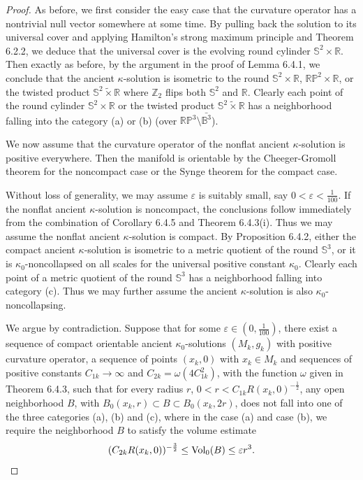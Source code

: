 \begin{proof}
As before, we first consider the easy case that the curvature
operator has a nontrivial null vector somewhere at some time. By
pulling back the solution to its universal cover and applying
Hamilton's strong maximum principle and Theorem 6.2.2, we deduce
that the universal cover is the evolving round cylinder
$\mathbb{S}^2 \times \mathbb{R}$. Then exactly as before, by the
argument in the proof of Lemma 6.4.1, we conclude that the ancient
$\kappa$-solution is isometric to the round $\mathbb{S}^2 \times
\mathbb{R}$, $\mathbb{R}\mathbb{P}^2 \times \mathbb{R}$, or the
twisted product $\mathbb{S}^2 \tilde{\times} \mathbb{R}$ where
$\mathbb{Z}_2$ flips both $\mathbb{S}^2$ and $\mathbb{R}$. Clearly
each point of the round cylinder $\mathbb{S}^2 \times \mathbb{R}$
or the twisted product $\mathbb{S}^2 \tilde{\times} \mathbb{R}$
has a neighborhood falling into the category (a) or (b) (over
$\mathbb{R}\mathbb{P}^3\setminus\bar{\mathbb{B}^3}$).

We now assume that the curvature operator of the nonflat ancient
$\kappa$-solution is positive everywhere. Then the manifold is
orientable by the Cheeger-Gromoll theorem \cite{CG} for the
noncompact case or the Synge theorem \cite{CE} for the compact
case.

Without loss of generality, we may assume $\varepsilon$ is
suitably small, say $0<\varepsilon < \frac{1}{100}$. If the
nonflat ancient $\kappa$-solution is noncompact, the conclusions
follow immediately from the combination of Corollary 6.4.5 and
Theorem 6.4.3(i). Thus we may assume the nonflat ancient
$\kappa$-solution is compact. By Proposition 6.4.2, either the
compact ancient $\kappa$-solution is isometric to a metric
quotient of the round $\mathbb{S}^3$, or it is
$\kappa_0$-noncollapsed on all scales for the universal positive
constant $\kappa_0$. Clearly each point of a metric quotient of
the round $\mathbb{S}^3$ has a neighborhood falling into category
(c). Thus we may further assume the ancient $\kappa$-solution is
also $\kappa_0$-noncollapsing.

We argue by contradiction. Suppose that for some $\varepsilon \in
(0, \frac{1}{100})$, there exist a sequence of compact orientable
ancient $\kappa_0$-solutions $(M_k,g_k)$ with positive curvature
operator, a sequence of points $(x_k,0)$ with $x_k\in M_k$ and
sequences of positive constants $C_{1k}\rightarrow\infty$ and
$C_{2k}=\omega(4C^2_{1k})$, with the function $\omega$ given in
Theorem 6.4.3, such that for every radius $r$,
$0<r<C_{1k}R(x_k,0)^{-\frac{1}{2}}$, any open neighborhood $B$,
with $B_0(x_k,r) \subset B \subset B_0(x_k,2r)$, does not fall
into one of the three categories (a), (b) and (c), where in the
case (a) and case (b), we require the neighborhood $B$ to satisfy
the volume estimate
$$
(C_{2k}R(x_k,0))^{-\frac{3}{2}} \leq \operatorname{Vol}_0(B) \leq \varepsilon
r^3.
$$


\end{proof}
